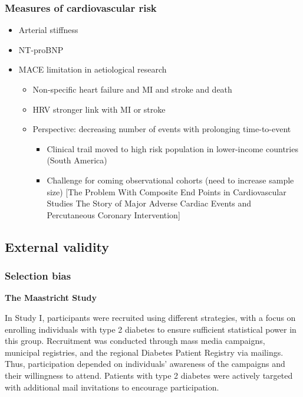 \documentclass[
  a4paper,
  headsepline=true,
  open=any]{scrbook}
\providecommand{\tightlist}{%
  \setlength{\itemsep}{0pt}\setlength{\parskip}{0pt}}\usepackage{longtable,booktabs,array}
\begin{document}
\hypertarget{measures-of-cardiovascular-risk}{%
\subsubsection{Measures of cardiovascular
risk}\label{measures-of-cardiovascular-risk}}

\begin{itemize}
\tightlist
\item
  Arterial stiffness
\item
  NT-proBNP
\item
  MACE limitation in aetiological research

  \begin{itemize}
  \tightlist
  \item
    Non-specific heart failure and MI and stroke and death
  \item
    HRV stronger link with MI or stroke
  \item
    Perspective: decreasing number of events with prolonging
    time-to-event

    \begin{itemize}
    \tightlist
    \item
      Clinical trail moved to high risk population in lower-income
      countries (South America)
    \item
      Challenge for coming observational cohorts (need to increase
      sample size) {[}The Problem With Composite End Points in
      Cardiovascular Studies The Story of Major Adverse Cardiac Events
      and Percutaneous Coronary Intervention{]}
    \end{itemize}
  \end{itemize}
\end{itemize}

\hypertarget{external-validity}{%
\subsection{External validity}\label{external-validity}}

\hypertarget{selection-bias}{%
\subsubsection{Selection bias}\label{selection-bias}}

\textbf{The Maastricht Study}

In Study I, participants were recruited using different strategies, with
a focus on enrolling individuals with type 2 diabetes to ensure
sufficient statistical power in this group. Recruitment was conducted
through mass media campaigns, municipal registries, and the regional
Diabetes Patient Registry via mailings. Thus, participation depended on
individuals' awareness of the campaigns and their willingness to attend.
Patients with type 2 diabetes were actively targeted with additional
mail invitations to encourage participation.
\end{document}
